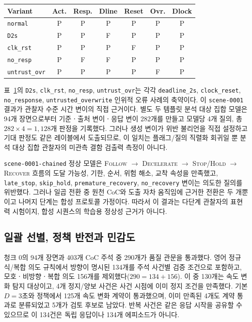 \begin{table}[!htbp]
\centering
{}
\label{tab:scene1-results}
\scriptsize
\setlength{\tabcolsep}{2.5pt}
\begin{tabular}{lcccccc}
\toprule
Variant & Act. & Resp. & Dline & Reset & Ovr. & Dlock \\
\midrule
\texttt{normal} & P & P & P & P & P & P \\
\texttt{D2s} & P & P & F & P & P & P \\
\texttt{clk\_rst} & P & P & P & F & P & P \\
\texttt{no\_resp} & P & F & F & P & P & P \\
\texttt{untrust\_ovr} & P & P & P & P & F & P \\
\bottomrule
\end{tabular}
\end{table}

표~\ref{tab:scene1-results}의 \texttt{D2s}, \texttt{clk\_rst}, \texttt{no\_resp}, \texttt{untrust\_ovr}는 각각 \texttt{deadline\_2s}, \texttt{clock\_reset}, \texttt{no\_response}, \texttt{untrusted\_overwrite} 인위적 오류 사례의 축약이다. 이 \texttt{scene-0001} 결과가 관찰자 수준 시간 변이의 직접 근거이다. 별도 두 템플릿 분석 대상 집합 모델은 94개 장면으로부터 기준ㆍ출처 변이ㆍ응답 변이 282개를 만들고 모델당 4개 질의, 총 $282 \times 4 = 1{,}128$개 판정을 기록했다. 그러나 생성 변이가 위반 불리언을 직접 설정하고 기대 판정도 같은 레이블에서 도출되므로, 이 일치는 플래그/질의 직렬화 회귀일 뿐 분석 대상 집합 관찰자의 미관측 결함 검출력 측정이 아니다.

\texttt{scene-0001-chained} 정상 모델은 \textsc{Follow} $\rightarrow$ \textsc{Decelerate} $\rightarrow$ \textsc{Stop/Hold} $\rightarrow$ \textsc{Recover} 흐름의 도달 가능성, 기한, 순서, 위험 해소, 교착 속성을 만족했고, \texttt{late\_stop}, \texttt{skip\_hold}, \texttt{premature\_recovery}, \texttt{no\_recovery} 변이는 의도한 질의를 위반했다. 그러나 일곱 전환 중 원천 CoC와 도출 자차 움직임에 근거한 전환은 두 개뿐이고 나머지 단계는 합성 프로토콜 가정이다. 따라서 이 결과는 다단계 관찰자의 표현력 시험이지, 합성 시퀀스의 학습용 정상성 근거가 아니다.

\subsection{일괄 선별, 정책 반전과 민감도}
\label{sec:results-rq2}

청크 0의 94개 장면과 403개 CoC 주석 중 290개가 품질 관문을 통과했다. 영어 정규식/복합 의도 규칙에서 방향이 명시된 134개를 주석 사건별 검증 조건으로 포함하고, 모호ㆍ비방향ㆍ복합 의도 156개를 제외했다($290=134+156$). 이 중 130개는 속도 변화 탐지 대상이고, 4개 정지/양보 사건은 사건 시점에 이미 정지 조건을 만족했다. 기본 $D=3$초와 \preserve 정책에서 125개 속도 변화 계약이 통과했으며, 이미 만족된 4개도 계약 통과로 분류되었고 5개가 검토 후보로 남았다. 반복 사건은 같은 응답 시작을 공유할 수 있으므로 이 134건은 독립 응답이나 134개 에피소드가 아니다.

